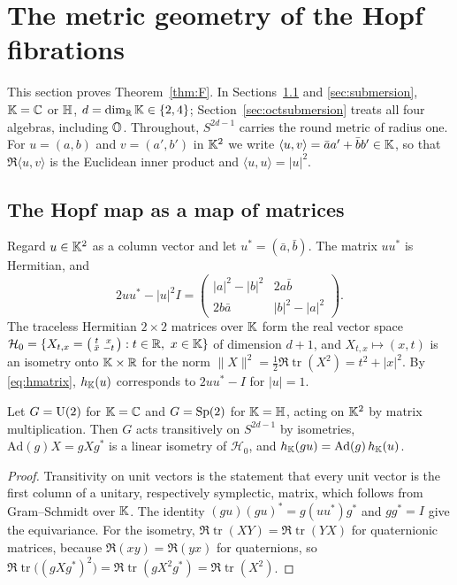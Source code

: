 \section{The metric geometry of the Hopf fibrations}\label{ch:geometry}

This section proves Theorem~\ref{thm:F}. In Sections~\ref{sec:matrices} and \ref{sec:submersion}, $\mathbb{K}=\mathbb{C}$ or $\mathbb{H}$, $d=\dim_{\mathbb{R}}\mathbb{K}\in\{2,4\}$; Section~\ref{sec:octsubmersion} treats all four algebras, including $\mathbb{O}$. Throughout, $S^{2d-1}$ carries the round metric of radius one. For $u=(a,b)$ and $v=(a',b')$ in $\mathbb{K}^2$ we write $\langle u,v\rangle=\bar aa'+\bar bb'\in\mathbb{K}$, so that $\Re\langle u,v\rangle$ is the Euclidean inner product and $\langle u,u\rangle=|u|^2$.

\subsection{The Hopf map as a map of matrices}\label{sec:matrices}

Regard $u\in\mathbb{K}^2$ as a column vector and let $u^*=(\bar a,\bar b)$. The matrix $uu^*$ is Hermitian, and
\begin{equation}\label{eq:hmatrix}
2uu^*-|u|^2I=\begin{pmatrix}|a|^2-|b|^2&2a\bar b\\ 2b\bar a&|b|^2-|a|^2\end{pmatrix}.
\end{equation}
The traceless Hermitian $2\times2$ matrices over $\mathbb{K}$ form the real vector space $\mathcal H_0=\{X_{t,x}=\left(\begin{smallmatrix}t&x\\ \bar x&-t\end{smallmatrix}\right):t\in\mathbb{R},\ x\in\mathbb{K}\}$ of dimension $d+1$, and $X_{t,x}\mapsto(x,t)$ is an isometry onto $\mathbb{K}\times\mathbb{R}$ for the norm $\|X\|^2=\tfrac12\Re\operatorname{tr}(X^2)=t^2+|x|^2$. By \eqref{eq:hmatrix}, $h_{\mathbb{K}}(u)$ corresponds to $2uu^*-I$ for $|u|=1$.

\begin{lemma}\label{lem:equivariance}
Let $G=\mathrm{U}(2)$ for $\mathbb{K}=\mathbb{C}$ and $G=\mathrm{Sp}(2)$ for $\mathbb{K}=\mathbb{H}$, acting on $\mathbb{K}^2$ by matrix multiplication. Then $G$ acts transitively on $S^{2d-1}$ by isometries, $\mathrm{Ad}(g)X=gXg^*$ is a linear isometry of $\mathcal H_0$, and $h_{\mathbb{K}}(gu)=\mathrm{Ad}(g)\,h_{\mathbb{K}}(u)$.
\end{lemma}

\begin{proof}
Transitivity on unit vectors is the statement that every unit vector is the first column of a unitary, respectively symplectic, matrix, which follows from Gram--Schmidt over $\mathbb{K}$. The identity $(gu)(gu)^*=g(uu^*)g^*$ and $gg^*=I$ give the equivariance. For the isometry, $\Re\operatorname{tr}(XY)=\Re\operatorname{tr}(YX)$ for quaternionic matrices, because $\Re(xy)=\Re(yx)$ for quaternions, so $\Re\operatorname{tr}\bigl((gXg^*)^2\bigr)=\Re\operatorname{tr}(gX^2g^*)=\Re\operatorname{tr}(X^2)$.
\end{proof}

